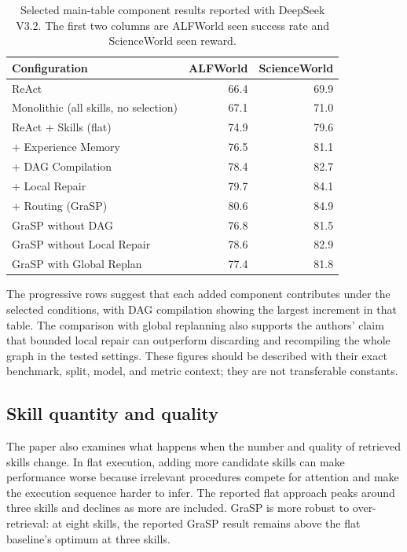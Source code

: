 \begin{table}[tbp]
\centering
\caption{Selected main-table component results reported with DeepSeek V3.2. The first two columns are ALFWorld seen success rate and ScienceWorld seen reward.}
\label{tab:ch17-component-results}
\small
\begin{tabularx}{\textwidth}{Xrr}
\toprule
\textbf{Configuration} & \textbf{ALFWorld} & \textbf{ScienceWorld} \\
\midrule
ReAct & 66.4 & 69.9 \\
Monolithic (all skills, no selection) & 67.1 & 71.0 \\
ReAct + Skills (flat) & 74.9 & 79.6 \\
+ Experience Memory & 76.5 & 81.1 \\
+ DAG Compilation & 78.4 & 82.7 \\
+ Local Repair & 79.7 & 84.1 \\
+ Routing (GraSP) & 80.6 & 84.9 \\
GraSP without DAG & 76.8 & 81.5 \\
GraSP without Local Repair & 78.6 & 82.9 \\
GraSP with Global Replan & 77.4 & 81.8 \\
\bottomrule
\end{tabularx}
\end{table}

The progressive rows suggest that each added component contributes under the selected conditions, with DAG compilation showing the largest increment in that table. The comparison with global replanning also supports the authors' claim that bounded local repair can outperform discarding and recompiling the whole graph in the tested settings. These figures should be described with their exact benchmark, split, model, and metric context; they are not transferable constants.


\subsection{Skill quantity and quality}

The paper also examines what happens when the number and quality of retrieved skills change. In flat execution, adding more candidate skills can make performance worse because irrelevant procedures compete for attention and make the execution sequence harder to infer. The reported flat approach peaks around three skills and declines as more are included. GraSP is more robust to over-retrieval: at eight skills, the reported GraSP result remains above the flat baseline's optimum at three skills.\autocite{xia2026grasp}

